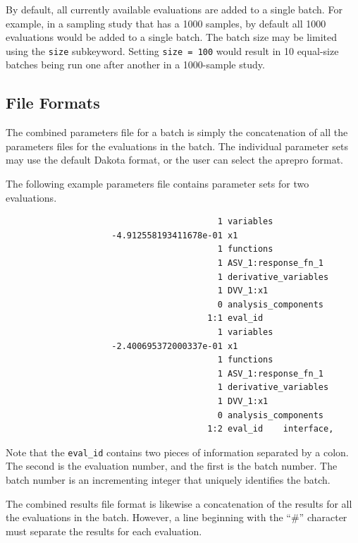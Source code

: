 By default, all currently available evaluations are added to a single
batch. For example, in a sampling study that has a 1000 samples, by
default all 1000 evaluations would be added to a single batch. The batch
size may be limited using the \texttt{size} subkeyword. Setting 
\texttt{size = 100} would result in 10 equal-size batches being run one
after another in a 1000-sample study. 

\subsection{File Formats}

The combined parameters file for a batch is simply the concatenation of 
all the parameters files for the evaluations in the batch. The individual
parameter sets may use the default Dakota format, or the user can select
the aprepro format.

The following example parameters file contains parameter sets for two
evaluations. 

\begin{small}
\begin{verbatim}
                                          1 variables
                     -4.912558193411678e-01 x1
                                          1 functions
                                          1 ASV_1:response_fn_1
                                          1 derivative_variables
                                          1 DVV_1:x1
                                          0 analysis_components
                                        1:1 eval_id
                                          1 variables
                     -2.400695372000337e-01 x1
                                          1 functions
                                          1 ASV_1:response_fn_1
                                          1 derivative_variables
                                          1 DVV_1:x1
                                          0 analysis_components
                                        1:2 eval_id    interface,
\end{verbatim}
\end{small}

Note that the \texttt{eval\_id} contains two pieces of 
information separated by a colon. The second is the evaluation number,
and the first is the batch number. The batch number is an incrementing
integer that uniquely identifies the batch.

The combined results file format is likewise a concatenation of the results
for all the evaluations in the batch. However, a line beginning with the
``\#'' character must separate the results for each evaluation.

